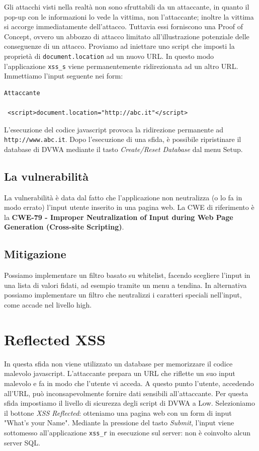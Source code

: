 Gli attacchi visti nella realtà non sono sfruttabili da un attaccante, in quanto il pop-up con le informazioni lo vede la vittima, non l'attaccante; inoltre la vittima si accorge immediatamente dell'attacco. Tuttavia essi forniscono una Proof of Concept, ovvero un abbozzo di attacco limitato all'illustrazione potenziale delle conseguenze di un attacco. Proviamo ad iniettare uno script che imposti la proprietà di \texttt{document.location} ad un nuovo URL. In questo modo l'applicazione \texttt{xss\_s} viene permanentemente ridirezionata ad un altro URL. Immettiamo l'input seguente nei form:
\begin{lstlisting}
Attaccante

 <script>document.location="http://abc.it"</script>
\end{lstlisting}
L'esecuzione del codice javascript provoca la ridirezione permanente ad \texttt{http://www.abc.it}. Dopo l'esecuzione di una sfida, è possibile ripristinare il database di DVWA mediante il tasto \textit{Create/Reset Database} dal menu Setup.

\subsection{La vulnerabilità}
La vulnerabilità è data dal fatto che l'applicazione non neutralizza (o lo fa in modo errato) l'input utente inserito in una pagina web. La CWE di riferimento è la \textbf{CWE-79 - Improper Neutralization of Input during Web Page Generation (Cross-site Scripting)}.

\subsection{Mitigazione}
Possiamo implementare un filtro basato su whitelist, facendo scegliere l'input in una lista di valori fidati, ad esempio tramite un menu a tendina. In alternativa possiamo implementare un filtro che neutralizzi i caratteri speciali nell'input, come accade nel livello high.


\section{Reflected XSS}
In questa sfida non viene utilizzato un database per memorizzare il codice malevolo javascript. L'attaccante prepara un URL che riflette un suo input malevolo e fa in modo che l'utente vi acceda. A questo punto l'utente, accedendo all'URL, può inconsapevolmente fornire dati sensibili all'attaccante. Per questa sfida impostiamo il livello di sicurezza degli script di DVWA a Low. Selezioniamo il bottone \textit{XSS Reflected}: otteniamo una pagina web con un form di input "What's your Name". Mediante la pressione del tasto \textit{Submit}, l'input viene sottomesso all'applicazione \texttt{xss\_r} in esecuzione sul server: non è coinvolto alcun server SQL.

